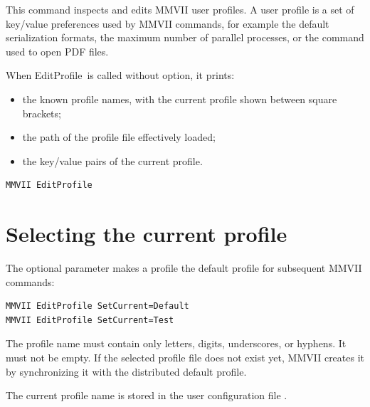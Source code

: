 \documentclass[a4paper]{article}
\newcommand{\TheCmd}{EditProfile}
\begin{document}
\sloppy

\CmdTitle

\tableofcontents



\SecDescr

This command inspects and edits MMVII user profiles.  A user profile is a set of
key/value preferences used by MMVII commands, for example the default serialization
formats, the maximum number of parallel processes, or the command used to open PDF
files.

When \TheCmd\ is called without option, it prints:

\begin{itemize}
  \item the known profile names, with the current profile shown between square brackets;
  \item the path of the profile file effectively loaded;
  \item the key/value pairs of the current profile.
\end{itemize}

\begin{verbatim}
MMVII EditProfile
\end{verbatim}



\section{Selecting the current profile}

The optional parameter  makes a profile the default profile for
subsequent MMVII commands:

\begin{verbatim}
MMVII EditProfile SetCurrent=Default
MMVII EditProfile SetCurrent=Test
\end{verbatim}

The profile name must contain only letters, digits, underscores, or hyphens.  It
must not be empty.  If the selected profile file does not exist yet, MMVII creates
it by synchronizing it with the distributed default profile.

The current profile name is stored in the user configuration file
.


\end{document}
